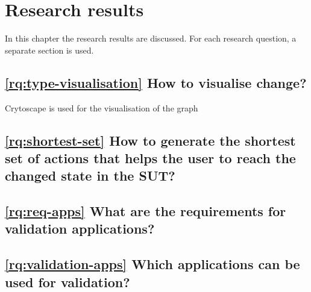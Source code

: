 \chapter{Research results}

In this chapter the research results are discussed.
For each research question, a separate section is used. 







\section{\ref{rq:type-visualisation} How to visualise change?} \label{rq:type-visualisation-answer}

Crytoscape is used for the visualisation of the graph 


\section{\ref{rq:shortest-set} How to generate the shortest set of actions that helps the user to reach the changed state in the SUT?}

\section{\ref{rq:req-apps} What are the requirements for validation applications?}

\section{\ref{rq:validation-apps} Which applications can be used for validation?}
